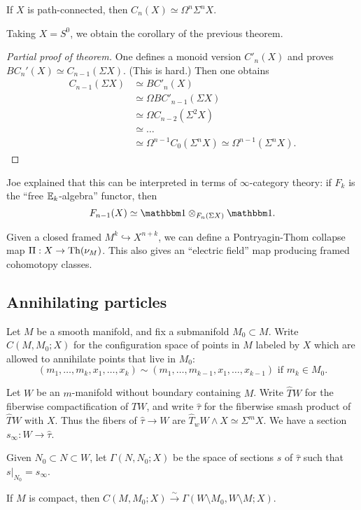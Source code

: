 \documentclass{article}
\begin{document}
\begin{thm}
	If $X$ is path-connected, then $C_n(X) \simeq \Omega^n \Sigma^n X$.
\end{thm}

Taking $X = S^0$, we obtain the corollary of the previous theorem.

\begin{proof}[Partial proof of theorem]
	One defines a monoid version $C'_n(X)$ and proves $BC_n'(X) \simeq C_{n-1}(\Sigma X)$.
	(This is hard.)
	Then one obtains
	\begin{align*}
		C_{n-1}(\Sigma X) &\simeq BC'_n(X) \\
				  &\simeq \Omega BC'_{n-1}(\Sigma X) \\
				  &\simeq \Omega C_{n-2}(\Sigma^2 X) \\
				  &\simeq \dots \\
				  &\simeq \Omega^{n-1} C_0(\Sigma^n X) \simeq \Omega^{n-1}(\Sigma^n X).
	\end{align*}
\end{proof}

\begin{rmk}
	Joe explained that this can be interpreted in terms of $\infty$-category theory: if $F_k$ is the ``free $\mathbb{E}_k$-algebra'' functor, then
	\[
		F_{n-1}(X) \simeq \onebb \otimes_{F_{n}(\Sigma X)} \onebb.
	\]
\end{rmk}

Given a closed framed $M^k \hookrightarrow X^{n+k}$, we can define a Pontryagin-Thom collapse map $\Pi: X \to \operatorname{Th}(\nu_M)$.
This also gives an ``electric field'' map producing framed cohomotopy classes.

\subsection{Annihilating particles}

Let $M$ be a smooth manifold, and fix a submanifold $M_0 \subset M$.
Write $C(M, M_0; X)$ for the configuration space of points in $M$ labeled by $X$ which are allowed to annihilate points that live in $M_0$:
\[
	(m_1, \dots, m_k, x_1, \dots, x_k) \sim (m_1, \dots, m_{k-1}, x_1, \dots, x_{k-1}) \textrm{ if } m_k \in M_0.
\]

Let $W$ be an $m$-manifold without boundary containing $M$.
Write $\hat{T} W$ for the fiberwise compactification of $TW$, and write $\hat{\tau}$ for the fiberwise smash product of $\hat{T} W$ with $X$.
Thus the fibers of $\hat{\tau} \to W$ are $\hat{T}_w W \wedge X \simeq \Sigma^m X$.
We have a section $s_\infty: W \to \hat{\tau}$.

\begin{dfn}
	Given $N_0 \subset N \subset W$, let $\Gamma(N, N_0; X)$ be the space of sections $s$ of $\hat{\tau}$ such that $s|_{N_0} = s_\infty$.
\end{dfn}

\begin{thm}
	If $M$ is compact, then $C(M, M_0; X) \xrightarrow{\sim} \Gamma(W \setminus M_0, W \setminus M; X)$.
\end{thm}
\end{document}
